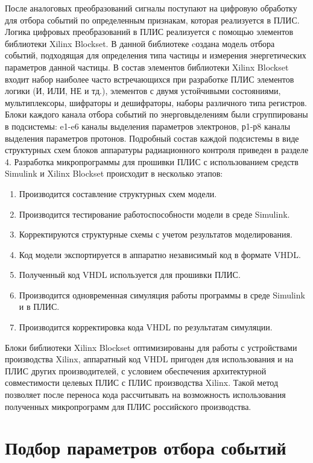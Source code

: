 После аналоговых преобразований сигналы поступают на цифровую обработку для отбора событий по определенным признакам, которая реализуется в ПЛИС. Логика цифровых преобразований в ПЛИС  реализуется с помощью элементов библиотеки Xilinx Blockset. В данной библиотеке cоздана модель отбора событий, подходящая для определения типа частицы и измерения энергетических параметров данной частицы. В состав элементов библиотеки Xilinx Blockset входит набор наиболее часто встречающихся при разработке ПЛИС элементов логики (И, ИЛИ, НЕ и тд.), элементов с двумя устойчивыми состояниями, мультиплексоры, шифраторы и дешифраторы, наборы различного типа регистров. Блоки каждого канала отбора событий по энерговыделениям были сгруппированы в подсистемы:
e1-e6 каналы выделения параметров электронов, 
р1-р8 каналы выделения параметров протонов. 
Подробный состав каждой подсистемы в виде структурных схем блоков аппаратуры радиационного контроля приведен в разделе 4.
Разработка микропрограммы для прошивки ПЛИС с использованием средств Simulink и Xilinx Blockset происходит в несколько этапов:
\begin{enumerate}
	\item Производится составление структурных схем модели.
	\item Производится тестирование работоспособности модели в среде Simulink.
	\item Корректируются структурные схемы с учетом результатов моделирования.
	\item Код модели экспортируется в аппаратно независимый код в формате VHDL.
	\item Полученный код VHDL используется для прошивки ПЛИС.
	\item Производится одновременная симуляция работы программы в среде Simulink и в ПЛИС.
	\item Производится корректировка кода VHDL по результатам симуляции.

\end{enumerate}

Блоки библиотеки Xilinx Blockset оптимизированы для работы с устройствами производства Xilinx, аппаратный код VHDL пригоден для использования и на ПЛИС других производителей, с условием обеспечения архитектурной совместимости целевых ПЛИС с ПЛИС производства Xilinx. Такой метод позволяет после переноса кода рассчитывать на возможность использования полученных микропрограмм для ПЛИС российского производства.


\section{Подбор параметров отбора событий}


